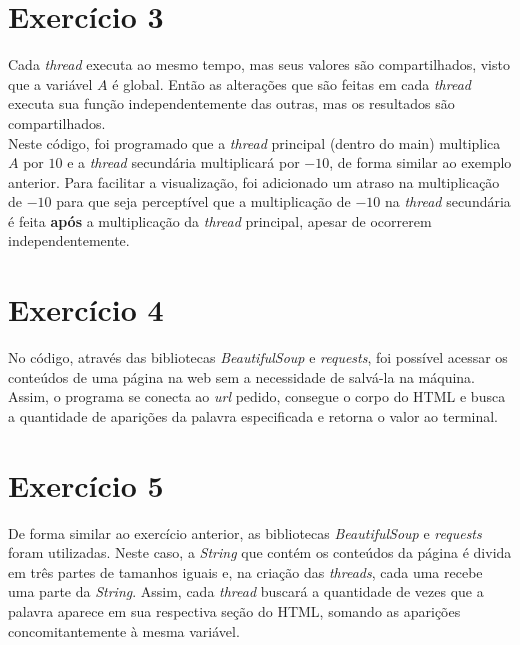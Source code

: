 \documentclass[a4paper,12pt]{article}
\begin{document}
\section{Exercício 3}
Cada \textit{thread} executa ao mesmo tempo, mas seus valores são compartilhados, visto que a variável $A$ é global. Então as alterações que são feitas em cada \textit{thread} executa sua função independentemente das outras, mas os resultados são compartilhados.\\
Neste código, foi programado que a \textit{thread} principal (dentro do main) multiplica $A$ por $10$ e a \textit{thread} secundária multiplicará por $-10$, de forma similar ao exemplo anterior. Para facilitar a visualização, foi adicionado um atraso na multiplicação de $-10$ para que seja perceptível que a multiplicação de $-10$ na \textit{thread} secundária é feita \textbf{após} a multiplicação da \textit{thread} principal, apesar de ocorrerem independentemente.

\section{Exercício 4}
No código, através das bibliotecas \textit{BeautifulSoup} e \textit{requests}, foi possível acessar os conteúdos de uma página na web sem a necessidade de salvá-la na máquina. Assim, o programa se conecta ao \textit{url} pedido, consegue o corpo do HTML e busca a quantidade de aparições da palavra especificada e retorna o valor ao terminal.

\section{Exercício 5}
De forma similar ao exercício anterior, as bibliotecas \textit{BeautifulSoup} e \textit{requests} foram utilizadas. Neste caso, a \textit{String} que contém os conteúdos da página é divida em três partes de tamanhos iguais e, na criação das \textit{threads}, cada uma recebe uma parte da \textit{String}. Assim, cada \textit{thread} buscará a quantidade de vezes que a palavra aparece em sua respectiva seção do HTML, somando as aparições concomitantemente à mesma variável.
\end{document}
